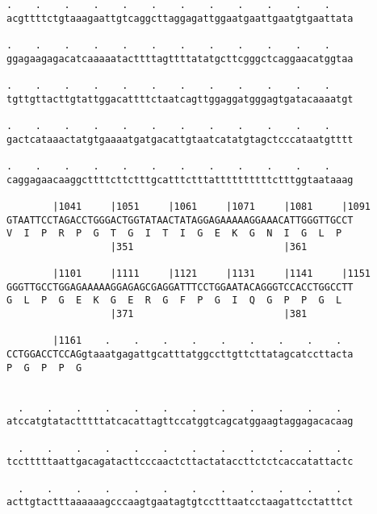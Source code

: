 \documentclass{article}
\begin{document}
\begin{Verbatim}
.    .    .    .    .    .    .    .    .    .    .    .    
acgttttctgtaaagaattgtcaggcttaggagattggaatgaattgaatgtgaattata
                                                            
.    .    .    .    .    .    .    .    .    .    .    .    
ggagaagagacatcaaaaatacttttagttttatatgcttcgggctcaggaacatggtaa
                                                            
.    .    .    .    .    .    .    .    .    .    .    .    
tgttgttacttgtattggacattttctaatcagttggaggatgggagtgatacaaaatgt
                                                            
.    .    .    .    .    .    .    .    .    .    .    .    
gactcataaactatgtgaaaatgatgacattgtaatcatatgtagctcccataatgtttt
                                                            
.    .    .    .    .    .    .    .    .    .    .    .    
caggagaacaaggcttttcttctttgcatttctttattttttttttctttggtaataaag
                                                            
        |1041     |1051     |1061     |1071     |1081     |1091
GTAATTCCTAGACCTGGGACTGGTATAACTATAGGAGAAAAAGGAAACATTGGGTTGCCT
V  I  P  R  P  G  T  G  I  T  I  G  E  K  G  N  I  G  L  P  
                  |351                          |361        
  
        |1101     |1111     |1121     |1131     |1141     |1151
GGGTTGCCTGGAGAAAAAGGAGAGCGAGGATTTCCTGGAATACAGGGTCCACCTGGCCTT
G  L  P  G  E  K  G  E  R  G  F  P  G  I  Q  G  P  P  G  L  
                  |371                          |381        
  
        |1161    .    .    .    .    .    .    .    .    .  
CCTGGACCTCCAGgtaaatgagattgcatttatggccttgttcttatagcatccttacta
P  G  P  P  G                                               
                                                            
  
  .    .    .    .    .    .    .    .    .    .    .    .  
atccatgtatactttttatcacattagttccatggtcagcatggaagtaggagacacaag
                                                            
  .    .    .    .    .    .    .    .    .    .    .    .  
tcctttttaattgacagatacttcccaactcttactataccttctctcaccatattactc
                                                            
  .    .    .    .    .    .    .    .    .    .    .    .  
acttgtactttaaaaaagcccaagtgaatagtgtcctttaatcctaagattcctatttct
                                                            

\end{Verbatim}
\end{document}
